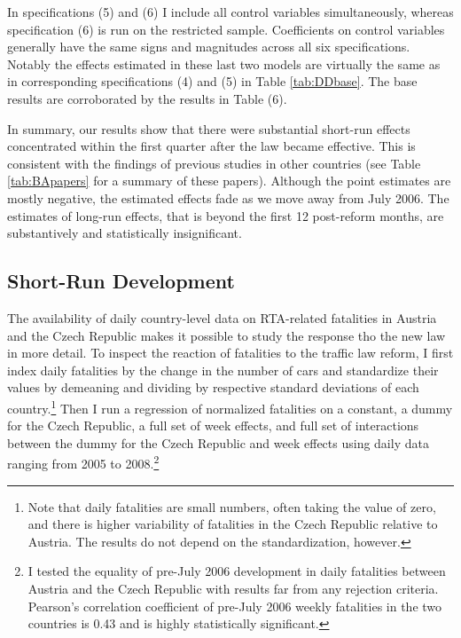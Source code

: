 \documentclass[12pt]{article}
\begin{document}
In specifications (5) and (6) I include all control variables simultaneously,
whereas specification (6) is run on the restricted sample. Coefficients on
control variables generally have the same signs and magnitudes across all six
specifications. Notably the effects estimated in these last two models are
virtually the same as in corresponding specifications (4) and (5) in Table
\ref{tab:DDbase}. The base results are corroborated by the results in Table (6).

In summary, our results show that there were substantial short-run effects
concentrated within the first quarter after the law became effective. This is
consistent with the findings of previous studies in other countries (see Table
\ref{tab:BApapers} for a summary of these papers). Although the point estimates
are mostly negative, the estimated effects fade as we move away from July 2006.
The estimates of long-run effects, that is beyond the first 12 post-reform
months, are substantively and statistically insignificant.   

\subsection{Short-Run Development} %

The availability of daily country-level data on RTA-related fatalities in
Austria and the Czech Republic makes it possible to study the response tho the
new law in more detail. To inspect the reaction of fatalities to the traffic
law reform, I first index daily fatalities by the change in the number of cars
and standardize their values by demeaning and dividing by respective standard
deviations of each country.\footnote{Note that daily fatalities are small
  numbers, often taking the value of zero, and there is higher variability of
  fatalities in the Czech Republic relative to Austria. The results do not
  depend on the standardization, however.} Then I run a regression of normalized
fatalities on a constant, a dummy for the Czech Republic, a full set of week
effects, and full set of interactions between the dummy for the Czech Republic
and week effects using daily data ranging from 2005 to 2008.\footnote{I tested
  the equality of pre-July 2006 development in daily fatalities between Austria
  and the Czech Republic with results far from any rejection criteria.
  Pearson's correlation coefficient of pre-July 2006 weekly fatalities in the
  two countries is 0.43 and is highly statistically significant.} 
\end{document}
